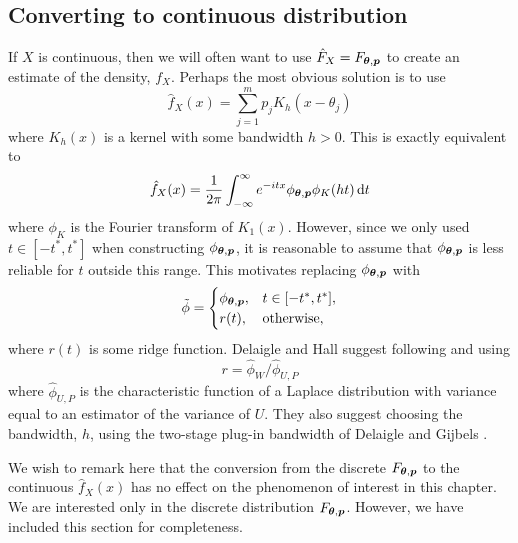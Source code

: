
	\subsection{Converting to continuous distribution}

	If $X$ is continuous, then we will often want to use $\hat{F}_X = F_{{\bm{{\theta}}}, {\bm{{p}}}}$ to create an estimate of the density, $f_X$. Perhaps the most obvious solution is to use
	\begin{equation}
		\hat{f}_X(x) = \sum_{j=1}^m p_j K_h(x - \theta_j)
	\end{equation}
	where $K_h(x)$ is a kernel with some bandwidth $h > 0$. This is exactly equivalent to 
	\begin{equation}
		\hat{f}_X(x) = \frac{1}{2\pi}\int_{-\infty}^{\infty} e^{-itx} \phi_{{\bm{{\theta}}}, {\bm{{p}}}} \phi_K(ht) \, \mathrm{d} t
	\end{equation}
	where $\phi_K$ is the Fourier transform of $K_1(x)$. However, since we only used $t \in [-t^*, t^*]$ when constructing $\phi_{{\bm{{\theta}}}, {\bm{{p}}}}$, it is reasonable to assume that $\phi_{{\bm{{\theta}}}, {\bm{{p}}}}$ is less reliable for $t$ outside this range. This motivates replacing $\phi_{{\bm{{\theta}}}, {\bm{{p}}}}$ with
	\begin{equation}
		\tilde{\phi} = 
		\begin{cases}
			\phi_{{\bm{{\theta}}}, {\bm{{p}}}}, & t \in [-t^*, t^*],\\
			r(t), & \text{otherwise},
		\end{cases}
	\end{equation}
	where $r(t)$ is some ridge function. Delaigle and Hall suggest following \cite{Delaigle2008-hl} and using
	\begin{equation}
		r = \hat{\phi}_W / \hat{\phi}_{U,P}
	\end{equation}
	where $\hat{\phi}_{U,P}$ is the characteristic function of a Laplace distribution with variance equal to an estimator of the variance of $U$. They also suggest choosing the bandwidth, $h$, using the two-stage plug-in bandwidth of Delaigle and Gijbels \cite{Delaigle2002-pa} \cite{Delaigle2004-fy}.

	We wish to remark here that the conversion from the discrete $F_{{\bm{{\theta}}}, {\bm{{p}}}}$ to the continuous $\hat{f}_X(x)$ has no effect on the phenomenon of interest in this chapter. We are interested only in the discrete distribution $F_{{\bm{{\theta}}}, {\bm{{p}}}}$. However, we have included this section for completeness.



